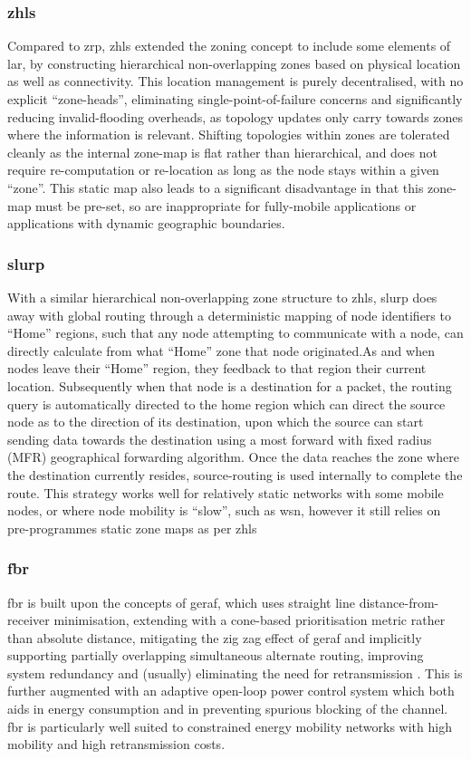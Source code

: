 \subsubsection{\gls{zhls}}
Compared to \gls{zrp}, \gls{zhls} extended the zoning concept to include some elements of \gls{lar}, by constructing hierarchical non-overlapping zones based on physical location as well as connectivity. This location management is purely decentralised, with no explicit ``zone-heads'', eliminating single-point-of-failure concerns and significantly reducing invalid-flooding overheads, as topology updates only carry towards zones where the information is relevant. Shifting topologies within zones are tolerated cleanly as the internal zone-map is flat rather than hierarchical, and does not require re-computation or re-location as long as the node stays within a given ``zone''. This static map also leads to a significant disadvantage in that this zone-map must be pre-set, so are inappropriate for fully-mobile applications or applications with dynamic geographic boundaries.\cite{Joa-Ng1999,Hamma2006}
\subsubsection{\gls{slurp}}
With a similar hierarchical non-overlapping zone structure to \gls{zhls}, \gls{slurp} does away with global routing through a deterministic mapping of node identifiers to ``Home'' regions, such that any node attempting to communicate with a node, can directly calculate from what ``Home'' zone that node originated.As and when nodes leave their ``Home'' region, they feedback to that region their current location. Subsequently when that node is a destination for a packet, the routing query is automatically directed to the home region which can direct the source node as to the direction of its destination, upon which the source can start sending data towards the destination using a most forward with fixed radius (MFR) geographical forwarding algorithm. Once the data reaches the zone where the destination currently resides, source-routing is used internally to complete the route. This strategy works well for relatively static networks with some mobile nodes, or where node mobility is ``slow'', such as \gls{wsn}, however it still relies on pre-programmes static zone maps as per \gls{zhls}\cite{Woo2001}
\subsubsection{\gls{fbr}}
\gls{fbr} is built upon the concepts of \gls{geraf}, which uses straight line distance-from-receiver minimisation, extending with a cone-based prioritisation metric rather than absolute distance, mitigating the zig zag effect of \gls{geraf} and implicitly supporting partially overlapping simultaneous alternate routing, improving system redundancy and (usually) eliminating the need for retransmission \cite{Jornet2008}.
This is further augmented with an adaptive open-loop power control system which both aids in energy consumption and in preventing spurious blocking of the channel.
\gls{fbr} is particularly well suited to constrained energy mobility networks with high mobility and high retransmission costs\cite{Noh2012}.


